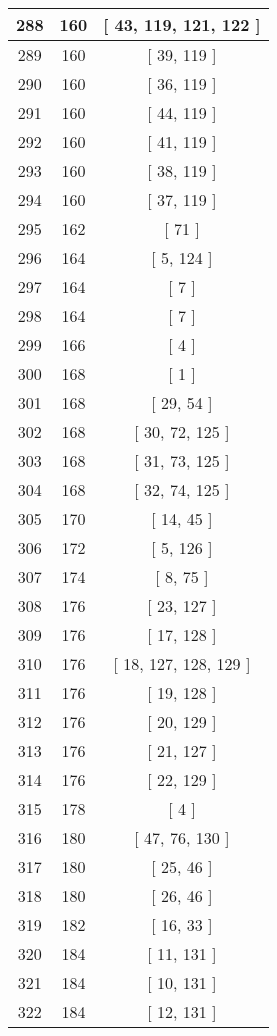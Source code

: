 \begin{center}
\begin{longtable}[H]{|| c c c ||}
\hline
288 & 160 & [ 43, 119, 121, 122 ] \\ 
\hline
289 & 160 & [ 39, 119 ] \\ 
\hline
290 & 160 & [ 36, 119 ] \\ 
\hline
291 & 160 & [ 44, 119 ] \\ 
\hline
292 & 160 & [ 41, 119 ] \\ 
\hline
293 & 160 & [ 38, 119 ] \\ 
\hline
294 & 160 & [ 37, 119 ] \\ 
\hline
295 & 162 & [ 71 ] \\ 
\hline
296 & 164 & [ 5, 124 ] \\ 
\hline
297 & 164 & [ 7 ] \\ 
\hline
298 & 164 & [ 7 ] \\ 
\hline
299 & 166 & [ 4 ] \\ 
\hline
300 & 168 & [ 1 ] \\ 
\hline
301 & 168 & [ 29, 54 ] \\ 
\hline
302 & 168 & [ 30, 72, 125 ] \\ 
\hline
303 & 168 & [ 31, 73, 125 ] \\ 
\hline
304 & 168 & [ 32, 74, 125 ] \\ 
\hline
305 & 170 & [ 14, 45 ] \\ 
\hline
306 & 172 & [ 5, 126 ] \\ 
\hline
307 & 174 & [ 8, 75 ] \\ 
\hline
308 & 176 & [ 23, 127 ] \\ 
\hline
309 & 176 & [ 17, 128 ] \\ 
\hline
310 & 176 & [ 18, 127, 128, 129 ] \\ 
\hline
311 & 176 & [ 19, 128 ] \\ 
\hline
312 & 176 & [ 20, 129 ] \\ 
\hline
313 & 176 & [ 21, 127 ] \\ 
\hline
314 & 176 & [ 22, 129 ] \\ 
\hline
315 & 178 & [ 4 ] \\ 
\hline
316 & 180 & [ 47, 76, 130 ] \\ 
\hline
317 & 180 & [ 25, 46 ] \\ 
\hline
318 & 180 & [ 26, 46 ] \\ 
\hline
319 & 182 & [ 16, 33 ] \\ 
\hline
320 & 184 & [ 11, 131 ] \\ 
\hline
321 & 184 & [ 10, 131 ] \\ 
\hline
322 & 184 & [ 12, 131 ] \\ 

\end{longtable}
\end{center}
